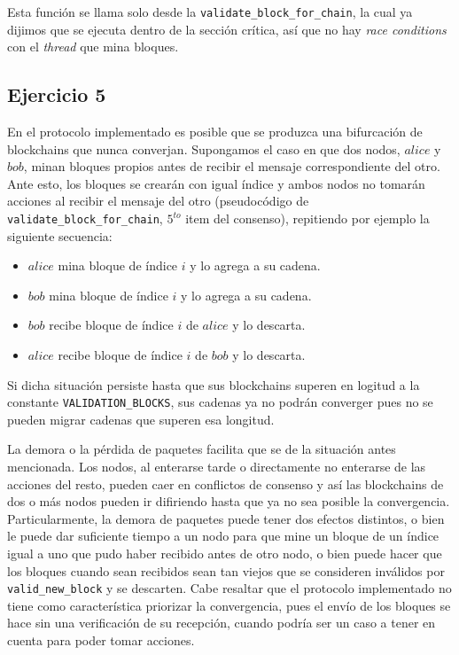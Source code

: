 \documentclass[10pt, a4paper, hidelinks]{article}
\begin{document}
Esta función se llama solo desde la \texttt{validate\_block\_for\_chain}, la cual ya dijimos que se ejecuta dentro de la sección crítica, así que no hay \textit{race conditions} con el \textit{thread} que mina bloques.

\subsection{Ejercicio 5}

En el protocolo implementado es posible que se produzca una bifurcación de blockchains que nunca converjan. Supongamos el caso en que dos nodos, $alice$ y $bob$, minan bloques propios antes de recibir el mensaje correspondiente del otro. Ante esto, los bloques se crearán con igual índice y ambos nodos no tomarán acciones al recibir el mensaje del otro (pseudocódigo de \texttt{validate\_block\_for\_chain}, $5^{to}$ item del consenso), repitiendo por ejemplo la siguiente secuencia:

\begin{itemize}
	\itemsep0em
    \item $alice$ mina bloque de índice $i$ y lo agrega a su cadena.
    \item $bob$ mina bloque de índice $i$ y lo agrega a su cadena.
	\item $bob$ recibe bloque de índice $i$ de $alice$ y lo descarta.
	\item $alice$ recibe bloque de índice $i$ de $bob$ y lo descarta.    
\end{itemize}
 
Si dicha situación persiste hasta que sus blockchains superen en logitud a la constante \texttt{VALIDATION\_BLOCKS}, sus cadenas ya no podrán converger pues no se pueden migrar cadenas que superen esa longitud.
    
La demora o la pérdida de paquetes facilita que se de la situación antes mencionada. Los nodos, al enterarse tarde o directamente no enterarse de las acciones del resto, pueden caer en conflictos de consenso y así las blockchains de dos o más nodos pueden ir difiriendo hasta que ya no sea posible la convergencia. Particularmente, la demora de paquetes puede tener dos efectos distintos, o bien le puede dar suficiente tiempo a un nodo para que mine un bloque de un índice igual a uno que pudo haber recibido antes de otro nodo, o bien puede hacer que los bloques cuando sean recibidos sean tan viejos que se consideren inválidos por \texttt{valid\_new\_block} y se descarten. Cabe resaltar que el protocolo implementado no tiene como característica priorizar la convergencia, pues el envío de los bloques se hace sin una verificación de su recepción, cuando podría ser un caso a tener en cuenta para poder tomar acciones.  
\end{document}
